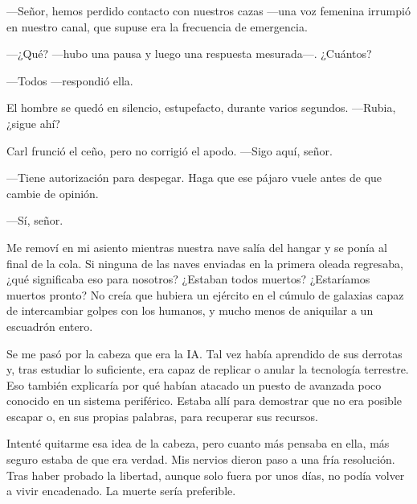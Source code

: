 —Señor, hemos perdido contacto con nuestros cazas —una voz femenina irrumpió en nuestro canal, que supuse era la frecuencia de emergencia.

 —¿Qué? —hubo una pausa y luego una respuesta mesurada—. ¿Cuántos?

—Todos —respondió ella.

El hombre se quedó en silencio, estupefacto, durante varios segundos. —Rubia, ¿sigue ahí?

Carl frunció el ceño, pero no corrigió el apodo. —Sigo aquí, señor.

—Tiene autorización para despegar. Haga que ese pájaro vuele antes de que cambie de opinión.

—Sí, señor.

Me removí en mi asiento mientras nuestra nave salía del hangar y se ponía al final de la cola. Si ninguna de las naves enviadas en la primera oleada regresaba, ¿qué significaba eso para nosotros? ¿Estaban todos muertos? ¿Estaríamos muertos pronto? No creía que hubiera un ejército en el cúmulo de galaxias capaz de intercambiar golpes con los humanos, y mucho menos de aniquilar a un escuadrón entero.

Se me pasó por la cabeza que era la IA. Tal vez había aprendido de sus derrotas y, tras estudiar lo suficiente, era capaz de replicar o anular la tecnología terrestre. Eso también explicaría por qué habían atacado un puesto de avanzada poco conocido en un sistema periférico. Estaba allí para demostrar que no era posible escapar o, en sus propias palabras, para recuperar sus recursos.

Intenté quitarme esa idea de la cabeza, pero cuanto más pensaba en ella, más seguro estaba de que era verdad. Mis nervios dieron paso a una fría resolución. Tras haber probado la libertad, aunque solo fuera por unos días, no podía volver a vivir encadenado. La muerte sería preferible.